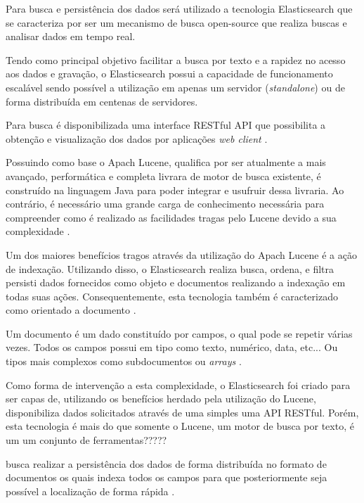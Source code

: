 Para busca e persistência dos dados será utilizado a tecnologia Elasticsearch que se caracteriza por ser um mecanismo de busca open-source que realiza buscas e analisar dados em tempo real.

Tendo como principal objetivo facilitar a busca por texto e a rapidez no acesso aos dados e gravação, o Elasticsearch possui a capacidade de funcionamento escalável sendo possível a utilização em apenas um servidor (\textit{standalone}) ou de forma distribuída em centenas de servidores.  

Para busca é disponibilizada uma interface RESTful API que possibilita a obtenção e visualização dos dados por aplicações \textit{web client} \cite{Gormley:2015}.

Possuindo como base o Apach Lucene, qualifica por ser atualmente a mais avançado, performática e completa livrara de motor de busca existente, é construído na linguagem Java para poder integrar e usufruir dessa livraria. Ao contrário, é necessário uma grande carga de conhecimento necessária para compreender como é realizado as facilidades tragas pelo Lucene devido a sua complexidade \cite{Gormley:2015}.

Um dos maiores benefícios tragos através da utilização do Apach Lucene é a ação de indexação. Utilizando disso, o Elasticsearch realiza busca, ordena, e filtra persisti dados fornecidos como objeto e documentos realizando a indexação em todas suas ações. Consequentemente, esta tecnologia também é caracterizado como orientado a documento \cite{Gormley:2015}.

Um documento é um dado constituído por campos, o qual pode se repetir várias vezes. Todos os campos possui em tipo como texto, numérico, data, etc... Ou tipos mais complexos como subdocumentos ou \textit{arrays} \cite{Kuc:2013}. 

Como forma de intervenção a esta complexidade, o Elasticsearch foi criado para  ser capas de, utilizando os benefícios herdado pela utilização do Lucene, disponibiliza dados solicitados através de uma simples uma API RESTful. Porém, esta tecnologia é mais do que somente o Lucene, um motor de busca por texto, é um um conjunto de ferramentas?????

busca realizar a persistência dos dados de forma distribuída no formato de documentos os quais indexa todos os campos para que posteriormente seja possível a localização de forma rápida \cite{Gormley:2015}. 
